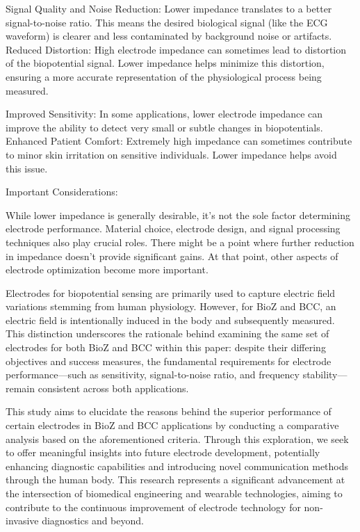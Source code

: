 {Signal Quality and Noise Reduction:  Lower impedance translates to a better signal-to-noise ratio. This means the desired biological signal (like the ECG waveform) is clearer and less contaminated by background noise or artifacts.
\cite{Grimnes2000bioimpedance}
Reduced Distortion:  High electrode impedance can sometimes lead to distortion of the biopotential signal. Lower impedance helps minimize this distortion, ensuring a more accurate representation of the physiological process being measured.
\cite{Tallgren2005Evaluation}

Improved Sensitivity: In some applications, lower electrode impedance can improve the ability to detect very small or subtle changes in biopotentials.
\cite{Buxi2013correlation}
Enhanced Patient Comfort: Extremely high impedance can sometimes contribute to minor skin irritation on sensitive individuals. Lower impedance helps avoid this issue.

Important Considerations:

While lower impedance is generally desirable, it's not the sole factor determining electrode performance. Material choice, electrode design, and signal processing techniques also play crucial roles.
There might be a point where further reduction in impedance doesn't provide significant gains. At that point, other aspects of electrode optimization become more important.


Electrodes for biopotential sensing are primarily used to capture electric field variations stemming from human physiology. However, for BioZ and BCC, an electric field is intentionally induced in the body and subsequently measured. This distinction underscores the rationale behind examining the same set of electrodes for both BioZ and BCC within this paper: despite their differing objectives and success measures, the fundamental requirements for electrode performance—such as sensitivity, signal-to-noise ratio, and frequency stability—remain consistent across both applications.

This study aims to elucidate the reasons behind the superior performance of certain electrodes in BioZ and BCC applications by conducting a comparative analysis based on the aforementioned criteria. Through this exploration, we seek to offer meaningful insights into future electrode development, potentially enhancing diagnostic capabilities and introducing novel communication methods through the human body. This research represents a significant advancement at the intersection of biomedical engineering and wearable technologies, aiming to contribute to the continuous improvement of electrode technology for non-invasive diagnostics and beyond.


}
